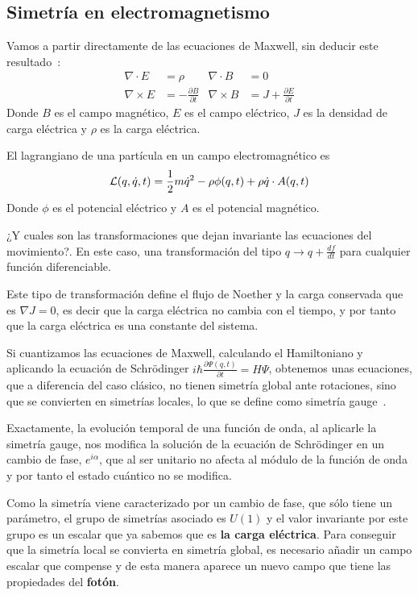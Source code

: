 \subsection{Simetría en electromagnetismo}\label{subsec:simetría-en-electromagnetismo}
Vamos a partir directamente de las ecuaciones de Maxwell, sin deducir este resultado~\autocite[38]{ISMPP}:
\begin{align}
	\label{eq:maxwell}
	\nabla\cdot E & = \rho & \nabla\cdot B & = 0 \\
	\nabla\times E & = -\frac{\partial B}{\partial t} & \nabla\times B & = J+\frac{\partial E}{\partial t}
\end{align}
Donde $B$ es el campo magnético, $E$ es el campo eléctrico, $J$ es la densidad de carga eléctrica y $\rho$ es la carga eléctrica.

El lagrangiano de una partícula en un campo electromagnético es
\begin{equation}
	\label{eq:lagrangiano-electromagnético}
	\mathcal{L}(q,\dot{q},t)=\frac{1}{2}m\dot{q}^2-\rho\phi(q, t)+\rho\dot{q}\cdot A(q,t)
\end{equation}
Donde $\phi$ es el potencial eléctrico y $A$ es el potencial magnético.

¿Y cuales son las transformaciones que dejan invariante las ecuaciones del movimiento?. En este caso, una transformación del tipo $q\longrightarrow q+\frac{df}{dt}$ para cualquier función diferenciable.

Este tipo de transformación define el flujo de Noether y la carga conservada que es $\nabla J=0$, es decir que la carga eléctrica no cambia con el tiempo, y por tanto que la carga eléctrica es una constante del sistema.

Si cuantizamos las ecuaciones de Maxwell, calculando el Hamiltoniano y aplicando la ecuación de Schrödinger $i\hbar\frac{\partial \Psi(q,t)}{\partial t}=H\Psi$, obtenemos unas ecuaciones, que a diferencia del caso clásico, no tienen simetría global ante rotaciones, sino que se convierten en simetrías locales, lo que se define como simetría gauge~\cite{MAQFT}.

Exactamente, la evolución temporal de una función de onda, al aplicarle la simetría gauge, nos modifica la solución de la ecuación de Schrödinger en un cambio de fase, $e^{i\alpha}$, que al ser unitario no afecta al módulo de la función de onda y por tanto el estado cuántico no se modifica.

Como la simetría viene caracterizado por un cambio de fase, que sólo tiene un parámetro, el grupo de simetrías asociado es $U(1)$ y el valor invariante por este grupo es un escalar que ya sabemos que es \textbf{la carga eléctrica}. Para conseguir que la simetría local se convierta en simetría global, es necesario añadir un campo escalar que compense y de esta manera aparece un nuevo campo que tiene las propiedades del \textbf{fotón}.

